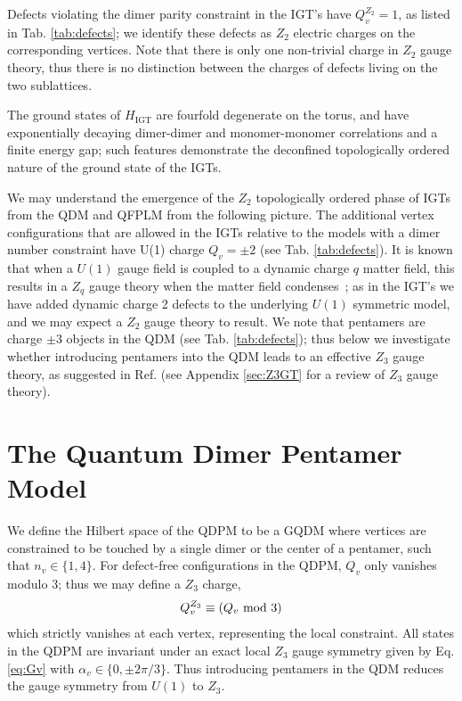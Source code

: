 \documentclass[twocolumn,prb,aps,floatfix,superscriptaddress]{revtex4-1}
\newcommand{\tabref}[1]{Tab. \ref{#1}}
\newcommand{\appref}[1]{Appendix \ref{#1}}
\newcommand{\Eqref}[1]{Eq. \eqref{#1}}
\newcommand{\HIGT}{H_\mathrm{IGT}}
\begin{document}
Defects violating the dimer parity constraint in the IGT's have $Q_v^{Z_2} = 1$, as listed in \tabref{tab:defects}; we identify these defects as $Z_2$ electric charges on the corresponding vertices. Note that there is only one non-trivial charge in $Z_2$ gauge theory, thus there is no distinction between the charges of defects living on the two sublattices.

The ground states of $\HIGT$ are fourfold degenerate on the torus, and have exponentially decaying dimer-dimer and monomer-monomer correlations and a finite energy gap; such features demonstrate the deconfined topologically ordered nature of the ground state of the IGTs.

We may understand the emergence of the $Z_2$ topologically ordered phase of IGTs from the QDM and QFPLM from the following picture. The additional vertex configurations that are allowed in the IGTs relative to the models with a dimer number constraint  have U(1) charge $Q_v = \pm 2$ (see \tabref{tab:defects}). It is known that when a $U(1)$ gauge field is coupled to a dynamic charge $q$ matter field, this results in a $Z_q$ gauge theory when the matter field condenses~\cite{Fradkin1979}; as in the IGT's we have added dynamic charge 2 defects to the underlying $U(1)$ symmetric model, and we may expect a $Z_2$ gauge theory to result. We note that pentamers are charge $\pm3$ objects in the QDM (see \tabref{tab:defects}); thus below we investigate whether introducing pentamers into the QDM leads to an effective $Z_3$ gauge theory, as suggested in Ref.  (see \appref{sec:Z3GT} for a review of $Z_3$ gauge theory).


\section{The Quantum Dimer Pentamer Model}
\label{sec:QDPM}

We define the Hilbert space of the QDPM to be a GQDM where vertices are constrained to be touched by a single dimer or the center of a pentamer, such that $n_v \in \{1,4\}$. For defect-free configurations in the QDPM, $Q_v$ only vanishes modulo $3$;  thus we may define a $Z_3$ charge,
\begin{equation}
Q_v^{Z_3} \equiv \left(Q_v~\rm{mod}~3\right)  \notag
\end{equation}
 which strictly vanishes at each vertex, representing the local constraint. All states in the QDPM are invariant under an exact local $Z_3$ gauge symmetry given by \Eqref{eq:Gv} with $\alpha_v \in \{0,\pm 2\pi/3\}$. Thus introducing pentamers in the QDM reduces the gauge symmetry from $U(1)$ to $Z_3$.
\end{document}
